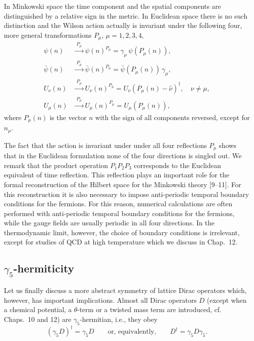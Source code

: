 In Minkowski space the time component and the spatial components are
distinguished by a relative sign in the metric. In Euclidean space there is no
such distinction and the Wilson action actually is invariant under the following
four, more general transformations $P_\mu$, $\mu = 1, 2, 3, 4$,
\begin{equation}
  \begin{aligned}
    \psi(n) &\xrightarrow{\;P_\mu\;} \psi(n)^{P_\mu} = \gamma_\mu\,\psi(P_\mu(n)),\\
    \bar{\psi}(n) &\xrightarrow{\;P_\mu\;} \bar{\psi}(n)^{P_\mu} = \bar{\psi}(P_\mu(n))\,\gamma_\mu,\\
    U_\nu(n) &\xrightarrow{\;P_\mu\;} U_\nu(n)^{P_\mu} = U_\nu(P_\mu(n)-\hat{\nu})^\dagger, \quad \nu \neq \mu,\\
    U_\mu(n) &\xrightarrow{\;P_\mu\;} U_\mu(n)^{P_\mu} = U_\mu(P_\mu(n)) ,
  \end{aligned}
\end{equation}
where $P_\mu(n)$ is the vector $n$ with the sign of all components reversed, except
for $n_\mu$.

The fact that the action is invariant under under all four reflections $P_\mu$
shows that in the Euclidean formulation none of the four directions is singled
out. We remark that the product operation $P_1 P_2 P_3$ corresponds to the Euclidean equivalent of time reflection. This reflection plays an important role for
the formal reconstruction of the Hilbert space for the Minkowski theory [9--11].
For this reconstruction it is also necessary to impose anti-periodic temporal
boundary conditions for the fermions. For this reason, numerical calculations
are often performed with anti-periodic temporal boundary conditions for the
fermions, while the gauge fields are usually periodic in all four directions. In
the thermodynamic limit, however, the choice of boundary conditions is irrelevant, except for studies of QCD at high temperature which we discuss in
Chap.~12.

\subsection{$\gamma_5$-hermiticity}

Let us finally discuss a more abstract symmetry of lattice Dirac operators
which, however, has important implications. Almost all Dirac operators $D$
(except when a chemical potential, a $\theta$-term or a twisted mass term are introduced, cf. Chaps.~10 and 12) are $\gamma_5$-hermitian, i.e., they obey
\begin{equation}
  (\gamma_5 D)^\dagger = \gamma_5 D
  \qquad \text{or, equivalently,} \qquad
  D^\dagger = \gamma_5 D \gamma_5 .
\end{equation}

